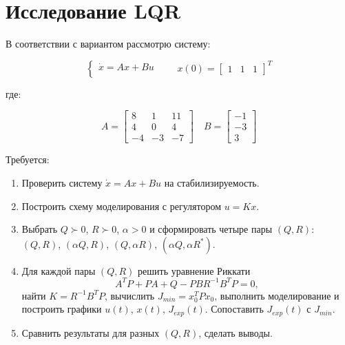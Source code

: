 \documentclass[a4paper,12pt]{article}
\begin{document}
	\newpage
	\tableofcontents
	
	\newpage \section{Исследование LQR}\label{sec:1}
	
	В соответствии с вариантом рассмотрю систему:
	
	\begin{equation}
		\begin{cases}
			\dot{x} = Ax + Bu \\
		\end{cases}
		\qquad
		x(0) = \begin{bmatrix} 1 & 1 & 1 \end{bmatrix}^T
		\label{sys}
	\end{equation}
	
	где:
	
	\[
	A = \begin{bmatrix} 
		8 & 1 & 11 \\ 
		4 & 0 & 4 \\ 
		-4 & -3 & -7 
	\end{bmatrix} \quad
	B = \begin{bmatrix} -1 \\ -3 \\ 3 \end{bmatrix} 
	\]
	
	
	Требуется:
	\begin{enumerate}
		\item Проверить систему $\dot{x} = Ax + Bu$ на стабилизируемость.
		
		\item Построить схему моделирования с регулятором $u = Kx$.
		
		\item Выбрать $Q \succ 0$, $R \succ 0$, $\alpha > 0$ и сформировать четыре пары $(Q,R)$: $(Q,R)$, $(\alpha Q,R)$, $(Q,\alpha R)$, $(\alpha Q,\alpha R^*)$.
		
		\item Для каждой пары $(Q,R)$ решить уравнение Риккати 
		\[
		A^T P + PA + Q - PBR^{-1}B^T P = 0,
		\]
		найти $K = R^{-1}B^T P$, вычислить $J_{min} = x_0^T P x_0$, выполнить моделирование и построить графики $u(t)$, $x(t)$, $J_{exp}(t)$. Сопоставить $J_{exp}(t)$ с $J_{min}$.
		
		\item Сравнить результаты для разных $(Q,R)$, сделать выводы.
	\end{enumerate}
	
\end{document}
